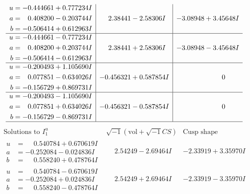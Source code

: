 \documentclass[1p]{elsarticle_modified}
\theoremstyle{definition}
\newcommand{\I}{\sqrt{-1}}
\begin{document}
$$\begin{array}{c|c|c}
\begin{aligned}
u &= -0.444661 + 0.777234 I \\
a &= \phantom{-}0.408200 - 0.203744 I \\
b &= -0.506414 + 0.612963 I\end{aligned}
 & \phantom{-}2.38441 - 2.58306 I & -3.08948 + 3.45648 I \\ \hline\begin{aligned}
u &= -0.444661 - 0.777234 I \\
a &= \phantom{-}0.408200 + 0.203744 I \\
b &= -0.506414 - 0.612963 I\end{aligned}
 & \phantom{-}2.38441 + 2.58306 I & -3.08948 - 3.45648 I \\ \hline\begin{aligned}
u &= -0.200493 + 1.105690 I \\
a &= \phantom{-}0.077851 - 0.634026 I \\
b &= -0.156729 + 0.869731 I\end{aligned}
 & -0.456321 + 0.587854 I & \phantom{-0.000000 } 0 \\ \hline\begin{aligned}
u &= -0.200493 - 1.105690 I \\
a &= \phantom{-}0.077851 + 0.634026 I \\
b &= -0.156729 - 0.869731 I\end{aligned}
 & -0.456321 - 0.587854 I & \phantom{-0.000000 } 0\\
 \hline 
 \end{array}$$\newpage$$\begin{array}{c|c|c}  
\text{Solutions to }I^u_{1}& \I (\text{vol} + \sqrt{-1}CS) & \text{Cusp shape}\\
 \hline 
\begin{aligned}
u &= \phantom{-}0.540784 + 0.670619 I \\
a &= -0.252084 - 0.024836 I \\
b &= \phantom{-}0.558240 + 0.478764 I\end{aligned}
 & \phantom{-}2.54249 - 2.69464 I & -2.33919 + 3.35970 I \\ \hline\begin{aligned}
u &= \phantom{-}0.540784 - 0.670619 I \\
a &= -0.252084 + 0.024836 I \\
b &= \phantom{-}0.558240 - 0.478764 I\end{aligned}
 & \phantom{-}2.54249 + 2.69464 I & -2.33919 - 3.35970 I \\ \hline\begin{aligned}

\end{aligned}
\end{array}$$
\end{document}
